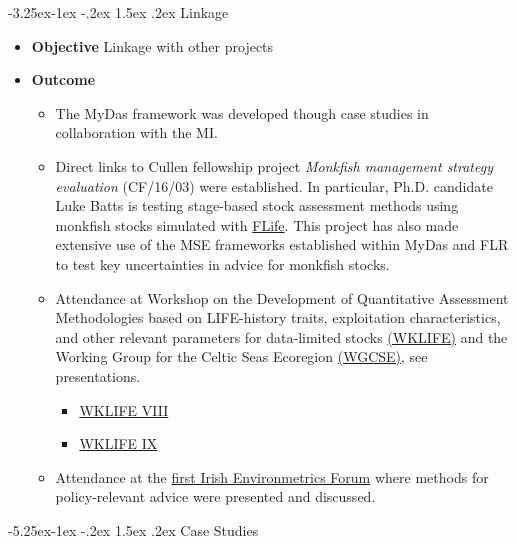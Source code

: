\documentclass[a4paper, 10pt]{article}
\makeatletter
\renewcommand{\subsection}{\@startsection{subsection}{2}{\z@}%
 {-3.25ex\@plus -1ex \@minus -.2ex}%
 {1.5ex \@plus .2ex}%
 {\normalfont\bfseries\slshape}}
\renewcommand{\section}{\@startsection{section}{1}{\z@}%
 {-5.25ex\@plus -1ex \@minus -.2ex}%
 {1.5ex \@plus .2ex}%
 {\normalfont\bfseries}}
\makeatother
\begin{document}
\subsection{Linkage}\label{task:link}

\begin{itemize}[labelindent=\parindent,noitemsep,topsep=0pt,parsep=0pt,partopsep=0pt]
 \item \textbf{Objective} Linkage with other projects
 \item \textbf{Outcome}
  \begin{itemize} 
  \item The MyDas framework was developed though case studies in collaboration with the MI.
  \item Direct links to Cullen fellowship project \emph{Monkfish management strategy evaluation} (CF/16/03) were established. In particular, Ph.D. candidate Luke Batts is testing stage-based stock assessment methods using monkfish stocks simulated with \href{https://github.com/flr/flife}{FLife}. This project has also made extensive use of the MSE frameworks established within MyDas and FLR to test key uncertainties in advice for monkfish stocks. 
  \item Attendance at Workshop on the Development of Quantitative Assessment Methodologies based on LIFE-history traits, exploitation characteristics, and other relevant parameters for data-limited stocks \href{https://www.ices.dk/community/groups/Pages/WKLIFEIX.aspx}{(WKLIFE)} and the Working Group for the Celtic Seas Ecoregion \href{https://www.ices.dk/community/groups/Pages/WGCSE.aspx}{(WGCSE)}, see presentations.
  \begin{itemize}
   \item \href{https://3o2y9wugzp1kfxr5hvzgzq-on.drv.tw/MyDas/presentations/mydas-wklifeix.html}{WKLIFE VIII}
   \item \href{https://3o2y9wugzp1kfxr5hvzgzq-on.drv.tw/MyDas/presentations/mydas-wklifeviii.html}{WKLIFE IX} 
 \end{itemize}
 \item Attendance at the \href{https://www.marine.ie/Home/site-area/news-events/news/first-environmetrics-forum-data-experts-ireland}{first Irish Environmetrics Forum} where methods for policy-relevant advice were presented and discussed.
 \end{itemize}
\end{itemize}

\newpage\section{Case Studies}\label{sec:case}
 
\end{document}
